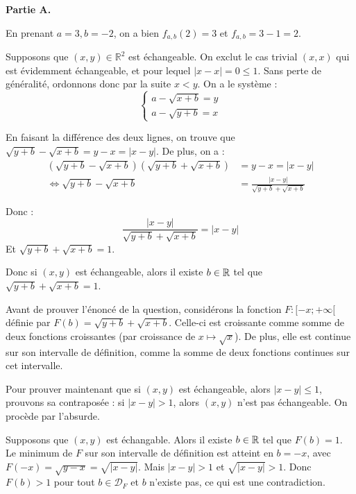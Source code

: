 \documentclass[]{../templates/homework}
\begin{document}
\textbf{Partie A.}

\subproblem


	\subproblem
	En prenant $a = 3, b=-2$, on a bien $f_{a,b}(2) = 3$ et $f_{a,b} = 3-1 = 2$.
	\subproblem
	
	Supposons que $(x,y) \in \mathbb R^2$ est échangeable. On exclut le cas trivial $(x,x)$ qui est évidemment échangeable, et pour lequel $|x-x| = 0 \leq 1$. Sans perte de généralité, ordonnons donc par la suite $x < y$. On a le système :
	\begin{equation*}
		\begin{cases}
			a - \sqrt{x+b} = y \\
			a - \sqrt{y+b} = x
		\end{cases}
	\end{equation*}
	
	En faisant la différence des deux lignes, on trouve que $\sqrt{y+b} - \sqrt{x+b} = y-x = |x-y|$. De plus, on a :
	\begin{equation*}
		\begin{split}
		(\sqrt{y+b} - \sqrt{x+b})(\sqrt{y+b} + \sqrt{x+b}) &=y-x = |x-y| \\
		 \iff \sqrt{y+b} - \sqrt{x+b} &= \frac {|x-y|}{\sqrt{y+b} + \sqrt{x+b}} 
		 \end{split}
	\end{equation*}
	
	Donc : $$\frac {|x-y|}{\sqrt{y+b} + \sqrt{x+b}} = |x-y|$$
	Et $\sqrt{y+b} + \sqrt{x+b} = 1$.
	
	Donc si $(x,y)$ est échangeable, alors il existe $b\in\mathbb R$ tel que $\sqrt{y+b} + \sqrt{x+b} = 1$.
	
	Avant de prouver l'énoncé de la question, considérons la fonction $F: [-x;+\infty[$ définie par $F(b) = \sqrt{y+b} + \sqrt{x+b}$. Celle-ci est croissante comme somme de deux fonctions croissantes (par croissance de $x\mapsto \sqrt x$). De plus, elle est continue sur son intervalle de définition, comme la somme de deux fonctions continues sur cet intervalle.

	Pour prouver maintenant que si $(x,y)$ est échangeable, alors $|x-y| \leq 1$, prouvons sa contraposée : si $|x-y| > 1$, alors $(x,y)$ n'est pas échangeable. On procède par l'absurde.
	
	Supposons que $(x,y)$ est échangable. Alors il existe $b\in\mathbb R$ tel que $F(b) = 1$. Le minimum de $F$ sur son intervalle de définition est atteint en $b=-x$, avec $F(-x) = \sqrt{y-x} = \sqrt{|x-y|}$. Mais $|x-y| > 1$ et $\sqrt{|x-y|} > 1$. Donc $F(b) > 1$ pour tout $b\in \mathcal D_F$ et $b$ n'existe pas, ce qui est une contradiction.
	
\end{document}
